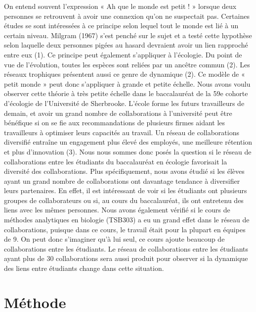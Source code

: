 \documentclass[9pt,twocolumn,twoside,]{pnas-new}
\begin{document}
On entend souvent l'expression « Ah que le monde est petit ! » lorsque
deux personnes se retrouvent à avoir une connexion qu'on ne suspectait
pas. Certaines études se sont intéressées à ce principe selon lequel
tout le monde est lié à un certain niveau. Milgram (1967) s'est penché
sur le sujet et a testé cette hypothèse selon laquelle deux personnes
pigées au hasard devraient avoir un lien rapproché entre eux (1). Ce
principe peut également s'appliquer à l'écologie. Du point de vue de
l'évolution, toutes les espèces sont reliées par un ancêtre commun (2).
Les réseaux trophiques présentent aussi ce genre de dynamique (2). Ce
modèle de « petit monde » peut donc s'appliquer à grande et petite
échelle. Nous avons voulu observer cette théorie à très petite échelle
dans le baccalauréat de la 59e cohorte d'écologie de l'Université de
Sherbrooke. L'école forme les futurs travailleurs de demain, et avoir un
grand nombre de collaborations à l'université peut être bénéfique si on
se fie aux recommandations de plusieurs firmes aidant les travailleurs à
optimiser leurs capacités au travail. Un réseau de collaborations
diversifié entraîne un engagement plus élevé des employés, une meilleure
rétention et plus d'innovation (3). Nous nous sommes donc posés la
question si le réseau de collaborations entre les étudiants du
baccalauréat en écologie favorisait la diversité des collaborations.
Plus spécifiquement, nous avons étudié si les élèves ayant un grand
nombre de collaborations ont davantage tendance à diversifier leurs
partenaires. En effet, il est intéressant de voir si les étudiants ont
plusieurs groupes de collaborateurs ou si, au cours du baccalauréat, ils
ont entretenu des liens avec les mêmes personnes. Nous avons également
vérifié si le cours de méthodes analytiques en biologie (TSB303) a eu un
grand effet dans le réseau de collaborations, puisque dans ce cours, le
travail était pour la plupart en équipes de 9. On peut donc s'imaginer
qu'à lui seul, ce cours ajoute beaucoup de collaborations entre les
étudiants. Le réseau de collaborations entre les étudiants ayant plus de
30 collaborations sera aussi produit pour observer si la dynamique des
liens entre étudiants change dans cette situation.

\hypertarget{muxe9thode}{%
\section{Méthode}\label{muxe9thode}}
\end{document}
